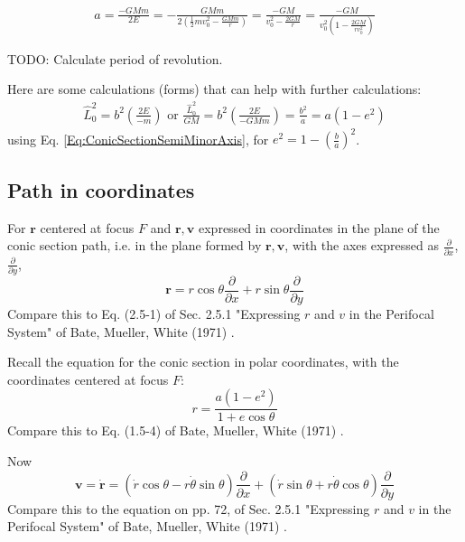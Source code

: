 \documentclass[10pt]{amsart}
\begin{document}
\begin{multicols*}{2}
\[
\begin{gathered} 
a = \frac{-GMm}{2E} = -\frac{GMm}{ 2 \left( \frac{1}{2} mv_0^2 - \frac{GMm}{r} \right) } = \frac{-GM}{v_0^2 - \frac{2GM}{r} } = \frac{-GM}{ v_0^2 \left( 1 -  \frac{2GM}{rv_0^2 } \right) }
\end{gathered} 
\]


TODO: Calculate period of revolution. 

Here are some calculations (forms) that can help with further calculations:
\begin{equation}
\begin{gathered} 
	\widehat{L}_0^2 = b^2 \left( \frac{2E}{-m} \right) \text{ or } \frac{\widehat{L}_0^2}{GM} = b^2 \left( \frac{2E}{-GMm } \right) = \frac{b^2}{a} = a(1-e^2)
\end{gathered} 
\end{equation}
using Eq. \ref{Eq:ConicSectionSemiMinorAxis}, for $e^2 = 1 - \left( \frac{b}{a} \right)^2$. 


\subsection{Path in coordinates} 

For $\mathbf{r}$ centered at focus $F$ and $\mathbf{r}, \mathbf{v}$ expressed in coordinates in the plane of the conic section path, i.e. in the plane formed by $\mathbf{r}, \mathbf{v}$, with the axes expressed as $\frac{\partial}{\partial x}$, $\frac{ \partial }{ \partial y}$, 
\begin{equation}
\mathbf{r} = r\cos{\theta} \frac{\partial }{ \partial x} + r\sin{\theta} \frac{\partial}{\partial y}
\end{equation}
Compare this to Eq. (2.5-1) of Sec. 2.5.1 "Expressing $r$ and $v$ in the Perifocal System" of Bate, Mueller, White (1971) \cite{BMW1971}.

Recall the equation for the conic section in polar coordinates, with the coordinates centered at focus $F$:
\begin{equation}
r = \frac{a(1-e^2) }{ 1 + e\cos{\theta}}
\end{equation}
Compare this to Eq. (1.5-4) of Bate, Mueller, White (1971) \cite{BMW1971}.

Now
\begin{equation}
\mathbf{v} = \dot{\mathbf{r}} = (\dot{r} \cos{\theta} - r\dot{\theta} \sin{\theta}) \frac{\partial}{\partial x} + (\dot{r}\sin{\theta} + r\dot{\theta}\cos{\theta}) \frac{\partial }{ \partial y}
\end{equation}
Compare this to the equation on pp. 72, of Sec. 2.5.1 "Expressing $r$ and $v$ in the Perifocal System" of Bate, Mueller, White (1971) \cite{BMW1971}.


\end{multicols*}
\end{document}

